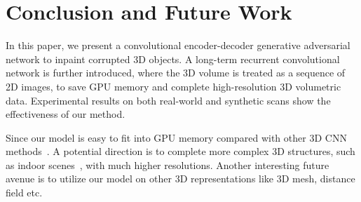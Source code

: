 \documentclass[10pt,twocolumn,letterpaper]{article}
\begin{document}
\section{Conclusion and Future Work}

In this paper, we present a convolutional encoder-decoder generative adversarial network to inpaint corrupted 3D objects. A long-term recurrent convolutional network is further introduced, where the 3D volume is treated as a sequence of 2D images, to save GPU memory and complete high-resolution 3D volumetric data. Experimental results on both real-world and synthetic scans show the effectiveness of our method.

Since our model is easy to fit into GPU memory compared with other 3D CNN methods~\cite{vconvdae,ssn}. A potential direction is to complete more complex 3D structures, such as indoor scenes~\cite{ssn,dai2017scannet}, with much higher resolutions. Another interesting future avenue is to utilize our model on other 3D representations like 3D mesh, distance field etc.

{\small


}
\end{document}
